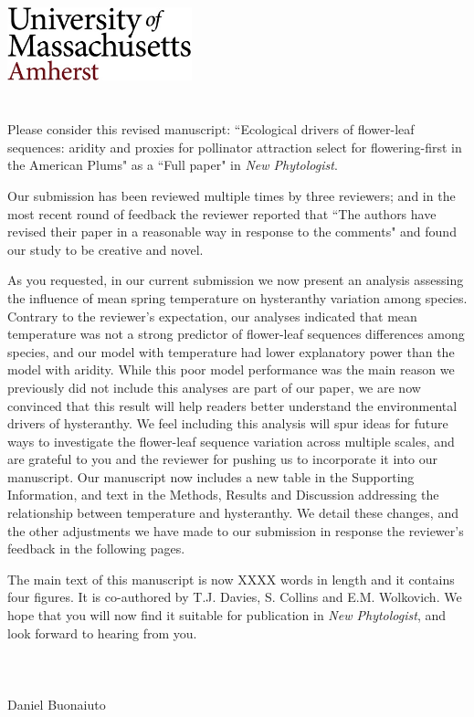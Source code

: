 \documentclass{article}[12pt]
\begin{document}

\noindent\includegraphics[width=0.4\textwidth]{umasslogo}\\\\

\\

\noindent Please consider this revised manuscript: ``Ecological drivers of flower-leaf sequences: aridity and proxies for pollinator attraction select for flowering-first in the American Plums" as a ``Full paper" in \textit{New Phytologist}.

Our submission has been reviewed multiple times by three reviewers; and in the most recent round of feedback the reviewer reported that  ``The authors have revised their paper in a reasonable way in response to the comments" and found our study to be creative and novel. 

As you requested, in our current submission we now present an analysis assessing the influence of mean spring temperature on hysteranthy variation among species. Contrary to the reviewer's expectation, our analyses indicated that mean temperature was not a strong predictor of flower-leaf sequences differences among species, and our model with temperature had lower explanatory power than the model with aridity. While this poor model performance was the main reason we previously did not include this analyses are part of our paper, we are now convinced that this result will help readers better understand the environmental drivers of hysteranthy. We feel including this analysis will spur ideas for future ways to investigate the flower-leaf sequence variation across multiple scales, and are grateful to you and the reviewer for pushing us to incorporate it into our manuscript. Our manuscript now includes a new table in the Supporting Information, and text in the Methods, Results and Discussion addressing the relationship between temperature and hysteranthy. We detail these changes, and the other adjustments we have made to our submission in response the reviewer's feedback in the following pages.

The main text of this manuscript is now XXXX words in length and it contains four figures. It is co-authored by T.J. Davies, S. Collins and E.M. Wolkovich. We hope that you will now find it suitable for publication in \emph{New Phytologist}, and look forward to hearing from you.\\\\\\\\

\noindent Daniel Buonaiuto\\

 
\end{document}

